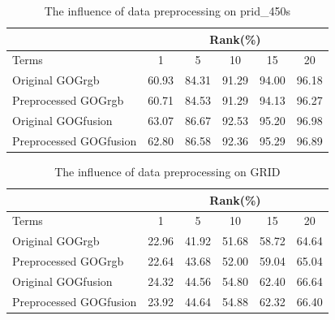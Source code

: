 \documentclass[conference,compsoc]{IEEEtran}
\begin{document}
\begin{table}[H]
\caption{The influence of data preprocessing on prid\_450s}
\begin{tabular}{|l|c|c|c|c|c|}
\hline
 & \multicolumn{5}{|c|}{Rank(\%)} \\
 \hline
Terms  &1 &5 & 10 &15& 20\\%
\hline
Original GOGrgb&60.93& 84.31& 91.29& 94.00& 96.18\\
\hline
Preprocessed GOGrgb &60.71& 84.53& 91.29& 94.13& 96.27\\
\hline
Original GOGfusion &63.07& 86.67& 92.53& 95.20& 96.98\\
\hline
Preprocessed GOGfusion &62.80& 86.58& 92.36& 95.29& 96.89\\
 \hline
 
\end{tabular}
\end{table}
\begin{table}[H]
\caption{The influence of data preprocessing on GRID}
\begin{tabular}{|l|c|c|c|c|c|}
\hline
 & \multicolumn{5}{|c|}{Rank(\%)} \\
 \hline
Terms  &1 &5 & 10 &15& 20\\
\hline
Original GOGrgb&22.96& 41.92& 51.68& 58.72& 64.64\\
\hline
Preprocessed GOGrgb &22.64& 43.68& 52.00& 59.04& 65.04\\
\hline
Original GOGfusion &24.32& 44.56& 54.80& 62.40& 66.64\\
\hline
Preprocessed GOGfusion &23.92& 44.64& 54.88& 62.32& 66.40\\
 \hline
 
\end{tabular}
\end{table}

\end{document}
